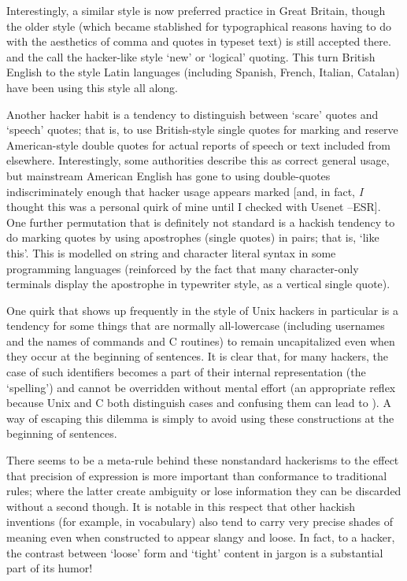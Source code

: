 Interestingly, a similar style is now preferred practice in Great Britain, though the older style (which became stablished for
typographical reasons having to do with the aesthetics of comma and quotes in typeset text) is still accepted there.
 and the  call the hacker-like style `new' or `logical'
quoting. This turn British English to the style Latin languages (including Spanish, French, Italian, Catalan) have been using this style
all along.

Another hacker habit is a tendency to distinguish between `scare' quotes and `speech' quotes; that is, to use British-style single quotes
for marking and reserve American-style double quotes for actual reports of speech or text included from elsewhere. Interestingly, some
authorities describe this as correct general usage, but mainstream American English has gone to using double-quotes indiscriminately
enough that hacker usage appears marked [and, in fact, \textit{I} thought this was a personal quirk of mine until I checked with Usenet
--ESR]. One further permutation that is definitely not standard is a hackish tendency to do marking quotes by using apostrophes (single
quotes) in pairs; that is, `like this'. This is modelled on string and character literal syntax in some programming languages (reinforced
by the fact that many character-only terminals display the apostrophe in typewriter style, as a vertical single quote).

One quirk that shows up frequently in the  style of Unix hackers in particular is a tendency for some things that are
normally all-lowercase (including usernames and the names of commands and C routines) to remain uncapitalized even when they occur at the
beginning of sentences. It is clear that, for many hackers, the case of such identifiers becomes a part of their internal representation
(the `spelling') and cannot be overridden without mental effort (an appropriate reflex because Unix and C both distinguish cases and
confusing them can lead to ). A way of escaping this dilemma is simply to avoid using these constructions at the
beginning of sentences.

There seems to be a meta-rule behind these nonstandard hackerisms to the effect that precision of expression is more important than
conformance to traditional rules; where the latter create ambiguity or lose information they can be discarded without a second though. It
is notable in this respect that other hackish inventions (for example, in vocabulary) also tend to carry very precise shades of meaning
even when constructed to appear slangy and loose. In fact, to a hacker, the contrast between `loose' form and `tight' content in jargon is
a substantial part of its humor!

